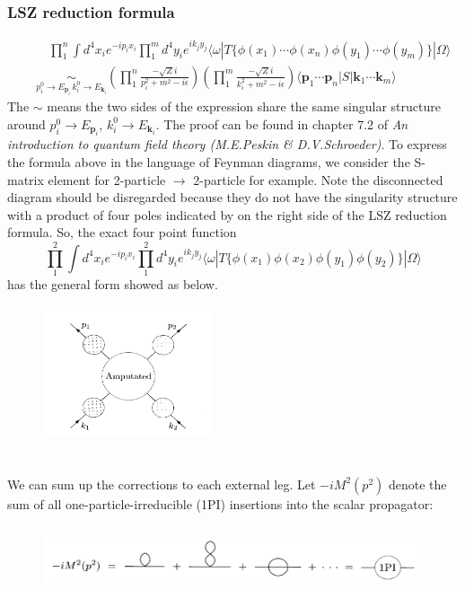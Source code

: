 \documentclass{article}
\begin{document}
\subsubsection{LSZ reduction formula}
\begin{eqnarray}
&& \quad \prod_1^n \int d^4 x_i e^{-ip_ix_i} \prod_1^m d^4 y_i e^{ik_jy_j} \langle \omega | T \{\phi(x_1) \cdots \phi(x_n) \phi(y_1) \cdots \phi(y_m)\} | \Omega \rangle \nonumber \\
&& \underset{ p_i^0 \to E_{\mathbf{p}_i}\, k_i^0 \to E_{\mathbf{k}_i}}{\sim}  \left( \prod_1^n \frac{-\sqrt{Z} i}{p_i^2 + m^2 -i\epsilon} \right) \left( \prod_1^m \frac{-\sqrt{Z} i}{k_i^2 + m^2 -i\epsilon} \right) \langle \mathbf{p}_1 \cdots \mathbf{p}_n | S | \mathbf{k}_1 \cdots \mathbf{k}_m \rangle \nonumber
\end{eqnarray}
The $\sim$ means the two sides of the expression share the same singular structure around $p_i^0 \to E_{\mathbf{p}_i}$, $k_i^0 \to E_{\mathbf{k}_i}$.
The proof can be found in chapter 7.2 of \emph{An introduction to quantum field theory (M.E.Peskin \& D.V.Schroeder)}.
To express the formula above in the language of Feynman diagrams, we consider the S-matrix element for 2-particle $\to$ 2-particle for example. Note the disconnected diagram should be disregarded because they do not have the singularity structure with a product of four poles indicated by on the right side of the LSZ reduction formula. So, the exact four point function
\[\prod_1^2 \int d^4 x_i e^{-ip_ix_i} \prod_1^2 d^4 y_i e^{ik_jy_j} \langle \omega | T \{\phi(x_1)\phi(x_2)\phi(y_1) \phi(y_2)\} | \Omega \rangle \]
has the general form showed as below.
\begin{figure}[!h]
\centering
\includegraphics[height=4cm ,width=5cm]{./pic/LSZ1.png}
\caption*{}
\end{figure}\\
We can sum up the corrections to each external leg. Let $-iM^2(p^2)$ denote the sum of all one-particle-irreducible (1PI) insertions into the scalar propagator:
\begin{figure}[!h]
\centering
\includegraphics[height=2cm ,width=15cm]{./pic/LSZ2.png}
\caption*{}
\end{figure}\\
\end{document}
